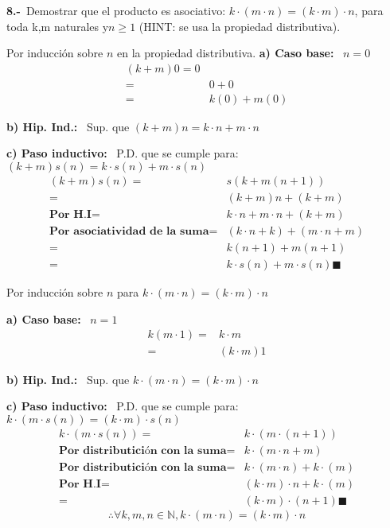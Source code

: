 \textbf{8.-}\ Demostrar que el producto es asociativo: $k\cdot(m\cdot n) = (k\cdot m)\cdot n$, para toda k,m
naturales y$n \geq 1$ (HINT: se usa la propiedad distributiva).

Por inducción sobre $n$ en la propiedad distributiva.
\textbf{a) Caso base: }\ $n=0$
\begin{align*}
    (k+m)0=0\\
          =&0+0\\
          =&k(0)+m(0)
\end{align*}

\textbf{b) Hip. Ind.: }\ Sup. que $(k+m)n=k\cdot n+m\cdot n$

\textbf{c) Paso inductivo: }\ P.D. que se cumple para: $(k+m)s(n) = k\cdot s(n) + m\cdot s(n)$
\begin{align*}
    (k+m)s(n)=&s(k+m(n+1))\\
            =&(k+m)n+(k+m)\\
    \textbf{Por H.I}=&k\cdot n + m\cdot n + (k+m)\\
     \textbf{Por asociatividad de la suma}=&(k\cdot n + k)+(m\cdot n+m)\\
      =& k(n+1)+m(n+1)\\
      =&k\cdot s(n)+m\cdot s(n)\blacksquare
\end{align*}

Por inducción sobre $n$ para $k\cdot(m\cdot n)=(k\cdot m)\cdot n$

\textbf{a) Caso base: }\ $n=1$
\begin{align*}
    k(m\cdot 1)=&k\cdot m\\
          =&(k\cdot m)1
\end{align*}

\textbf{b) Hip. Ind.: }\ Sup. que $k\cdot(m\cdot n)=(k\cdot m)\cdot n$

\textbf{c) Paso inductivo: }\ P.D. que se cumple para: $k\cdot(m\cdot s(n))=(k\cdot m)\cdot s(n)$
\begin{align*}
    k\cdot(m\cdot s(n))=& k\cdot(m\cdot (n+1))\\
   \textbf{Por distributición con la suma} =&k\cdot(m\cdot n + m )\\
   \textbf{Por distributición con la suma} =&k\cdot(m\cdot n) + k\cdot(m)\\
   \textbf{Por H.I} =&(k\cdot m)\cdot n + k\cdot(m)\\
                =&(k\cdot m)\cdot (n + 1) \blacksquare
\end{align*}
$$\therefore \forall k,m,n\in \mathbb{N}, k\cdot(m\cdot n)=(k\cdot m)\cdot n$$

